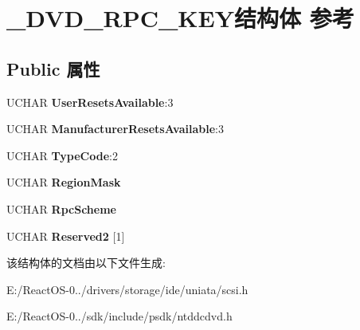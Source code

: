 \hypertarget{struct___d_v_d___r_p_c___k_e_y}{}\section{\+\_\+\+D\+V\+D\+\_\+\+R\+P\+C\+\_\+\+K\+E\+Y结构体 参考}
\label{struct___d_v_d___r_p_c___k_e_y}
\subsection*{Public 属性}
\begin{DoxyCompactItemize}
\item 
\mbox{\label{struct___d_v_d___r_p_c___k_e_y_a34ed769baf3047f0a7ece1d2a3de744e}} 
U\+C\+H\+AR {\bfseries User\+Resets\+Available}\+:3
\item 
\mbox{\label{struct___d_v_d___r_p_c___k_e_y_a85a83f24d030fc2cc12981a63acadc6a}} 
U\+C\+H\+AR {\bfseries Manufacturer\+Resets\+Available}\+:3
\item 
\mbox{\label{struct___d_v_d___r_p_c___k_e_y_a3f8cc302209dabe855c51d233dc77d2d}} 
U\+C\+H\+AR {\bfseries Type\+Code}\+:2
\item 
\mbox{\label{struct___d_v_d___r_p_c___k_e_y_aac68130ea0ef5b9120fee97cfa9b6b1e}} 
U\+C\+H\+AR {\bfseries Region\+Mask}
\item 
\mbox{\label{struct___d_v_d___r_p_c___k_e_y_a59f23443889b6be4bac3158bae4c6de5}} 
U\+C\+H\+AR {\bfseries Rpc\+Scheme}
\item 
\mbox{\label{struct___d_v_d___r_p_c___k_e_y_ad90c20c10bf2d38413171c47ce4ce7ac}} 
U\+C\+H\+AR {\bfseries Reserved2} \mbox{[}1\mbox{]}
\end{DoxyCompactItemize}


该结构体的文档由以下文件生成\+:\begin{DoxyCompactItemize}
\item 
E\+:/\+React\+O\+S-\/0../drivers/storage/ide/uniata/scsi.\+h\item 
E\+:/\+React\+O\+S-\/0../sdk/include/psdk/ntddcdvd.\+h\end{DoxyCompactItemize}
